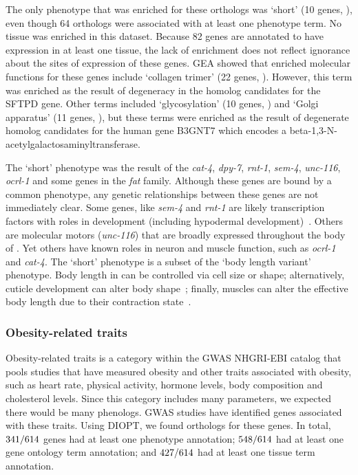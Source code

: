 The only phenotype that was enriched for these orthologs was `short' (10 genes,
), even though 64 orthologs were associated with at least
one phenotype term. No tissue was enriched in this dataset. Because
82 genes are annotated to have expression in at least one tissue, the lack of
enrichment does not reflect ignorance about the sites of expression of these
genes. GEA showed that enriched
molecular functions for these genes include `collagen trimer' (22 genes,
). However, this term was enriched as the result of degeneracy in the
homolog candidates for the SFTPD gene. Other terms included
 `glycosylation' (10 genes, ) and `Golgi apparatus' (11
genes, ), but these terms were enriched as the result of degenerate homolog
candidates for the human gene B3GNT7 which encodes a
beta-1,3-N-acetylgalactosaminyltransferase.

The `short' phenotype was the result of the \emph{cat-4}, \emph{dpy-7},
\emph{rnt-1}, \emph{sem-4}, \emph{unc-116}, \emph{ocrl-1} and some genes in the
\emph{fat} family. Although these genes are bound by a common phenotype, any
genetic relationships between these genes are not immediately clear. Some genes,
like \emph{sem-4} and \emph{rnt-1} are likely transcription factors with roles
in development (including hypodermal development)~\citep{Desai1988,Ji2004}.
Others are molecular motors (\emph{unc-116}) that are broadly expressed throughout
the body of \cel{}. Yet others have known roles in neuron and muscle function,
such as \emph{ocrl-1} and \emph{cat-4}. The `short' phenotype is a subset of
the `body length variant' phenotype. Body length in \cel{} can be controlled via
cell size or shape\citep{Wang2002,Nakano2004}; alternatively, cuticle development can alter body
shape~\citep{Cox1980,Kramer1988}; finally, muscles can alter the effective body
length due to their contraction state~\citep{Lewis1980}.


\subsubsection*{Obesity-related traits}
Obesity-related traits is a category within the GWAS NHGRI-EBI catalog that
pools studies that have measured obesity and other traits associated with
obesity, such as heart rate, physical activity, hormone levels, body composition
and cholesterol levels. Since this category includes many parameters,
we expected there would be many phenologs. GWAS studies have identified
\hobesity{} genes associated with these traits. Using DIOPT, we found
\wobesity{} orthologs for these genes. In total, $341/614{}$ genes had
at least one phenotype annotation; $548/614{}$ had at least one gene ontology term
annotation; and $427/614{}$ had at least one tissue term annotation.

